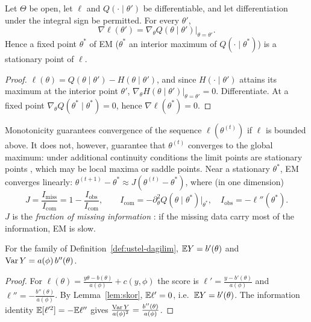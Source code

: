 \documentclass[main.tex]{subfiles}
\begin{document}
\begin{proposition}\label{prop:em-duragan}
Let $\Theta$ be open, let $\ell$ and $Q(\cdot\mid\theta')$ be differentiable, and let differentiation under the integral sign be permitted. For every $\theta'$,
\[
\nabla\ell(\theta')=\nabla_\theta Q(\theta\mid\theta')\big|_{\theta=\theta'} .
\]
Hence a fixed point $\theta^*$ of EM ($\theta^*$ an interior maximum of $Q(\cdot\mid\theta^*)$) is a stationary point of $\ell$.
\end{proposition}
\begin{proof}
$\ell(\theta)=Q(\theta\mid\theta')-H(\theta\mid\theta')$, and since $H(\cdot\mid\theta')$ attains its maximum at the interior point $\theta'$, $\nabla_\theta H(\theta\mid\theta')|_{\theta=\theta'}=0$. Differentiate. At a fixed point $\nabla_\theta Q(\theta^*\mid\theta^*)=0$, hence $\nabla\ell(\theta^*)=0$.
\end{proof}

\begin{remark}
Monotonicity guarantees convergence of the sequence $\ell(\theta^{(t)})$ if $\ell$ is bounded above. It does not, however, guarantee that $\theta^{(t)}$ converges to the global maximum: under additional continuity conditions the limit points are stationary points \cite{wu83}, which may be local maxima or saddle points. Near a stationary $\theta^*$, EM converges linearly: $\theta^{(t+1)}-\theta^*\approx J(\theta^{(t)}-\theta^*)$, where (in one dimension)
\[
J=\frac{I_{\text{miss}}}{I_{\text{com}}}=1-\frac{I_{\text{obs}}}{I_{\text{com}}},\qquad I_{\text{com}}=-\partial^2_\theta Q(\theta\mid\theta^*)\big|_{\theta^*},\quad I_{\text{obs}}=-\ell''(\theta^*).
\]
$J$ is the \emph{fraction of missing information} \cite{dempster77}: if the missing data carry most of the information, EM is slow.
\end{remark}

\begin{proposition}\label{prop:edf-moment}
For the family of Definition~\ref{def:ustel-dagilim}, $\mathbb{E} Y=b'(\theta)$ and $\operatorname{Var} Y=a(\phi)\,b''(\theta)$.
\end{proposition}
\begin{proof}
For $\ell(\theta)=\frac{y\theta-b(\theta)}{a(\phi)}+c(y,\phi)$ the score is $\ell'=\frac{y-b'(\theta)}{a(\phi)}$ and $\ell''=-\frac{b''(\theta)}{a(\phi)}$. By Lemma~\ref{lem:skor}, $\mathbb{E}\ell'=0$, i.e.\ $\mathbb{E} Y=b'(\theta)$. The information identity $\mathbb{E}[\ell'^2]=-\mathbb{E}\ell''$ gives $\frac{\operatorname{Var} Y}{a(\phi)^2}=\frac{b''(\theta)}{a(\phi)}$.
\end{proof}
\end{document}

